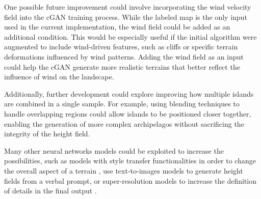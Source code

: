 One possible future improvement could involve incorporating the wind velocity field into the cGAN training process. While the labeled map is the only input used in the current implementation, the wind field could be added as an additional condition. This would be especially useful if the initial algorithm were augmented to include wind-driven features, such as cliffs or specific terrain deformations influenced by wind patterns. Adding the wind field as an input could help the cGAN generate more realistic terrains that better reflect the influence of wind on the landscape.

Additionally, further development could explore improving how multiple islands are combined in a single sample. For example, using blending techniques to handle overlapping regions could allow islands to be positioned closer together, enabling the generation of more complex archipelagos without sacrificing the integrity of the height field.

Many other neural networks models could be exploited to increase the possibilities, such as models with style transfer functionalities \cite{Gatys2015,Zhu2020} in order to change the overall aspect of a terrain \cite{Perche2023a,Perche2023b}, use text-to-images models \cite{Rombach2021,Radford2021} to generate height fields from a verbal prompt, or super-resolution models \cite{Dong2014} to increase the definition of details in the final output \cite{Guerin2016a}.
